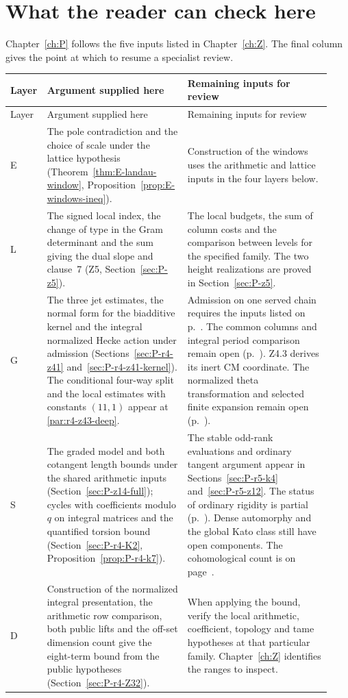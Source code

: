 \section*{What the reader can check here}
Chapter~\ref{ch:P} follows the five inputs listed in Chapter~\ref{ch:Z}.
The final column gives the point at which to resume a specialist review.

{\small
\begin{longtable}{@{}p{0.06\linewidth}p{0.43\linewidth}p{0.44\linewidth}@{}}
\toprule
Layer & Argument supplied here & Remaining inputs for review \\\midrule
\endfirsthead
\toprule
Layer & Argument supplied here & Remaining inputs for review \\\midrule
\endhead
E & The pole contradiction and the choice of scale under the lattice
hypothesis (Theorem~\ref{thm:E-landau-window}, Proposition~\ref{prop:E-windows-ineq}). &
Construction of the windows uses the arithmetic and lattice inputs in the
four layers below.\\[4pt]
L & The signed local index, the change of type in the Gram determinant
and the sum giving the dual slope and clause~7 (Z5,
Section~\ref{sec:P-z5}). &
The local budgets, the sum of column costs and the comparison between levels for the specified family. The two height realizations are proved in Section~\ref{sec:P-z5}.\\[4pt]
G & The three jet estimates, the normal form for the biadditive kernel and the integral normalized Hecke action under admission (Sections~\ref{sec:P-r4-z41} and~\ref{sec:P-r4-z41-kernel}). The conditional four-way split and the local estimates with constants $(11,1)$ appear at \ref{par:r4-z43-deep}. &
Admission on one served chain requires the inputs listed on p.~\pageref{r8:Z4.2.12}. The common columns and integral period comparison remain open (p.~\pageref{r6:review:Z4.4}). Z4.3 derives its inert CM coordinate. The normalized theta transformation and selected finite expansion remain open (p.~\pageref{r9:z43-open}).\\[4pt]
S & The graded model and both cotangent length bounds under the shared arithmetic inputs (Section~\ref{sec:P-z14-full}); cycles with coefficients modulo $q$ on integral matrices and the quantified torsion bound (Section~\ref{sec:P-r4-K2}, Proposition~\ref{prop:P-r4-k7}). &
The stable odd-rank evaluations and ordinary tangent argument appear in Sections~\ref{sec:P-r5-k4} and~\ref{sec:P-r5-z12}. The status of ordinary rigidity is partial (p.~\pageref{r6:review:Z1.2}). Dense automorphy and the global Kato class still have open components. The cohomological count is on page~\pageref{r6:Z1.5.02}.\\[4pt]
D & Construction of the normalized integral presentation, the arithmetic row comparison, both public lifts and the off-set dimension count give the eight-term bound from the public hypotheses (Section~\ref{sec:P-r4-Z32}). &
When applying the bound, verify the local arithmetic, coefficient, topology and tame hypotheses at that particular family. Chapter~\ref{ch:Z} identifies the ranges to inspect.\\
\bottomrule
\end{longtable}}

